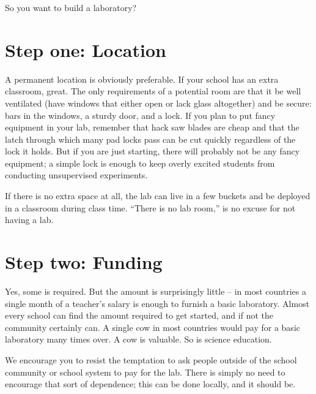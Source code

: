 So you want to build a laboratory?

\section{Step one: Location}
A permanent location is obviously preferable. If your school has an extra classroom, great. The only requirements of a potential room are that it be well ventilated (have windows that either open or lack glass altogether) and be secure: bars in the windows, a sturdy door, and a lock. If you plan to put fancy equipment in your lab, remember that hack saw blades are cheap and that the latch through which many pad locks pass can be cut quickly regardless of the lock it holds. But if you are just starting, there will probably not be any fancy equipment; a simple lock is enough to keep overly excited students from conducting unsupervised experiments.

If there is no extra space at all, the lab can live in a few buckets and be deployed in a classroom 
during class time. ``There is no lab room,'' is no excuse for not having a lab.

\section{Step two: Funding}
Yes, some is required. But the amount is surprisingly little -- in most countries a single month of a teacher's salary is enough to furnish a basic laboratory. Almost every school can find the amount required to get started, and if not the community certainly can. A single cow in most countries would pay 
for a basic laboratory many times over. A cow is valuable. So is science education.

We encourage you to resist the temptation to ask people outside of the school community or school system 
to pay for the lab. There is simply no need to encourage that sort of dependence; this can be done locally, and it should be.
